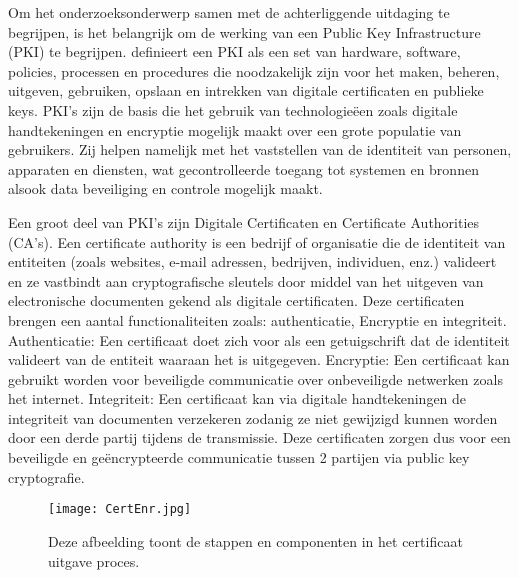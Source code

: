 \label{sec:Basis begrippen}
Om het onderzoeksonderwerp samen met de achterliggende uitdaging te begrijpen, is het belangrijk om de werking van een Public Key Infrastructure (PKI) te begrijpen.
\textcite{Thales2025} definieert een PKI als een set van hardware, software, policies, processen en procedures die noodzakelijk zijn voor het maken, beheren, uitgeven, gebruiken, opslaan en intrekken van digitale certificaten en publieke keys.
PKI's zijn de basis die het gebruik van technologieëen zoals digitale handtekeningen en encryptie mogelijk maakt over een grote populatie van gebruikers.
Zij helpen namelijk met het vaststellen van de identiteit van personen, apparaten en diensten, wat gecontrolleerde toegang tot systemen en bronnen alsook data beveiliging en controle mogelijk maakt. \break

Een groot deel van PKI's zijn Digitale Certificaten en Certificate Authorities (CA's).
Een certificate authority is een bedrijf of organisatie die de identiteit van entiteiten (zoals websites, e-mail adressen, bedrijven, individuen, enz.) valideert en ze vastbindt aan cryptografische sleutels door middel van het uitgeven van electronische documenten gekend als digitale certificaten.
Deze certificaten brengen een aantal functionaliteiten zoals: authenticatie, Encryptie en integriteit.
Authenticatie: Een certificaat doet zich voor als een getuigschrift dat de identiteit valideert van de entiteit waaraan het is uitgegeven.
Encryptie: Een certificaat kan gebruikt worden voor beveiligde communicatie over onbeveiligde netwerken zoals het internet.
Integriteit: Een certificaat kan via digitale handtekeningen de integriteit van documenten verzekeren zodanig ze niet gewijzigd kunnen worden door een derde partij tijdens de transmissie.
Deze certificaten zorgen dus voor een beveiligde en geëncrypteerde communicatie tussen 2 partijen via public key cryptografie. \autocite{SSLcom} \break

\begin{figure}
  \centering
  \texttt{[image: CertEnr.jpg]}
  \caption[Certificate enrollment.]{\label{fig:certenr}Deze afbeelding toont de stappen en componenten in het certificaat uitgave proces.}
\end{figure}

